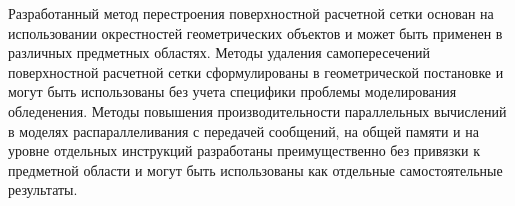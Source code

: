 Разработанный метод перестроения поверхностной расчетной сетки основан на использовании окрестностей геометрических объектов и может быть применен в различных предметных областях.
Методы удаления самопересечений поверхностной расчетной сетки сформулированы в геометрической постановке и могут быть использованы без учета специфики проблемы моделирования обледенения.
Методы повышения производительности параллельных вычислений в моделях распараллеливания с передачей сообщений, на общей памяти и на уровне отдельных инструкций разработаны преимущественно без привязки к предметной области и могут быть использованы как отдельные самостоятельные результаты.